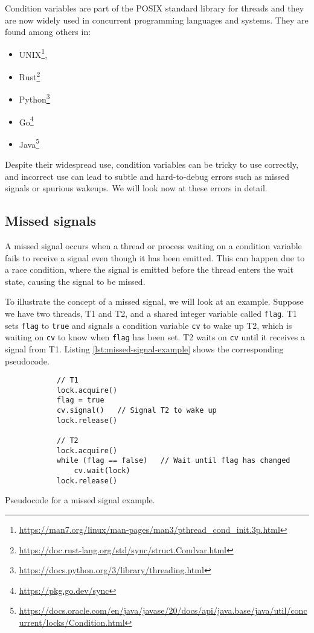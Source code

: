 Condition variables are part of the POSIX standard library for threads \cite{nichols1996pthreads}
and they are now widely used in concurrent programming languages and systems.
They are found among others in:

\begin{itemize}
      \item UNIX\footnote{\url{https://man7.org/linux/man-pages/man3/pthread_cond_init.3p.html}},
      \item Rust\footnote{\url{https://doc.rust-lang.org/std/sync/struct.Condvar.html}}
      \item Python\footnote{\url{https://docs.python.org/3/library/threading.html}}
      \item Go\footnote{\url{https://pkg.go.dev/sync}}
      \item Java\footnote{
                  \url{https://docs.oracle.com/en/java/javase/20/docs/api/java.base/java/util/concurrent/locks/Condition.html}}
\end{itemize}

Despite their widespread use, condition variables can be tricky to use correctly,
and incorrect use can lead to subtle and
hard-to-debug errors such as missed signals or spurious wakeups.
We will look now at these errors in detail.

\subsection{Missed signals}

A missed signal occurs when a thread or process waiting on a condition variable
fails to receive a signal even though it has been emitted.
This can happen due to a race condition, where the signal is emitted
before the thread enters the wait state, causing the signal to be missed.

To illustrate the concept of a missed signal, we will look at an example.
Suppose we have two threads, T1 and T2,
and a shared integer variable called \texttt{flag}.
T1 sets \texttt{flag} to \texttt{true} and signals
a condition variable \texttt{cv} to wake up T2,
which is waiting on \texttt{cv} to know when \texttt{flag} has been set.
T2 waits on \texttt{cv} until it receives a signal from T1.
Listing \ref{lst:missed-signal-example} shows the corresponding pseudocode.

\begin{listing}[!htb]
      \begin{verbatim}
            // T1
            lock.acquire()
            flag = true
            cv.signal()   // Signal T2 to wake up
            lock.release()
            
            // T2
            lock.acquire()
            while (flag == false)   // Wait until flag has changed
                cv.wait(lock)
            lock.release()
      \end{verbatim}
      \caption{Pseudocode for a missed signal example.}
      \label{lst:missed-signal-example}
\end{listing}

